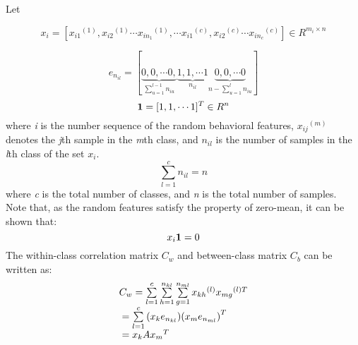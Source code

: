 \documentclass[10pt,journal,compsoc]{IEEEtran}
\begin{document}
Let
\begin{small}
\begin{equation}
{x_i} = [{x_{i1}}^{(1)},{x_{i2}}^{(1)} \cdots {x_{i{n_1}}}^{(1)}, \cdots {x_{i1}}^{(c)},{x_{i2}}^{(c)} \cdots {x_{i{n_c}}}^{(c)}] \in {R^{{m_i} \times n}}
\end{equation}
\end{small}
\begin{equation}
{e_{{n_{il}}}} = [\underbrace {0,0, \cdots 0,}_{\sum\limits_{u = 1}^{l - 1} {{n_{iu}}} }\underbrace {1,1, \cdots 1}_{{n_{il}}}\underbrace {0,0, \cdots 0}_{n - \sum\limits_{u = 1}^l {{n_{iu}}} }]
\end{equation}
\begin{equation}
{\bf{1}} = {[1,1, \cdots 1]^T} \in {R^n}
\end{equation}
where \textit{i} is the number sequence of the random behavioral features, ${x_{ij}}^{(m)}$ denotes the \textit{j}th sample in the \textit{m}th class, and ${n_{il}}$ is the number of samples in the \textit{l}th class of the set $x_i$.
\begin{equation}
\sum\limits_{l = 1}^c {{n_{il}}}  = n
\end{equation}
where \textit{c} is the total number of classes, and \textit{n} is the total number of samples. \\ Note that, as the random features satisfy the property of zero-mean, it can be shown that:
\begin{equation}
{x_i}  {\bf{1}} = 0
\end{equation}
The within-class correlation matrix $C_w$ and between-class matrix $C_b$  can be written as:
\begin{equation} \begin{array}{l}
{C_w} = \sum\limits_{l = 1}^c {\sum\limits_{h = 1}^{{n_{kl}}} {\sum\limits_{g = 1}^{{n_{ml}}} {{x_{kh}}^{(l)}{x_{mg}}^{(l)T}} } } \\
{\rm{    }} = \sum\limits_{l = 1}^c {({x_k}{e_{{n_{kl}}}}){{({x_m}{e_{{n_{ml}}}})}^T}} \\
{\rm{    }} = {x_k}A{x_m}^T
\end{array} \end{equation}
\end{document}
